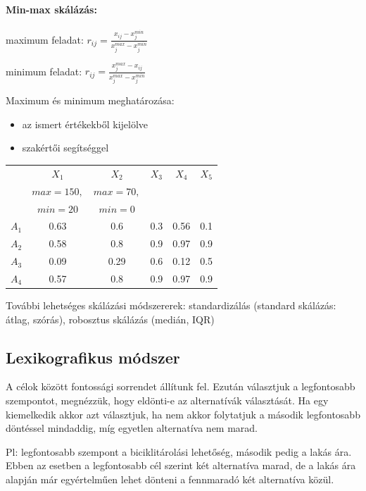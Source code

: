 \documentclass[a4paper,12pt]{article}
\begin{document}
\paragraph{Min-max skálázás:}
\begin{center}
maximum feladat: $r_{ij} = \frac{x_{ij} - x^{min}_j}{x^{max}_j - x^{min}_j} $ 

minimum feladat: $r_{ij} = \frac{x^{max}_j - x_{ij}}{x^{max}_j - x^{min}_j} $
\end{center}
Maximum és minimum meghatározása:
\vspace{-0.2cm}
\begin{itemize}
\item az ismert értékekből kijelölve
\vspace{-0.3cm}
\item szakértői segítséggel
\end{itemize}

\begin{center}
\begin{tabular}{c||c|c|c|c|c}
 & $X_1$& $X_2$& $X_3$& $X_4$& $X_5$ \\
  &\small{$max=150,$}&\small{$max=70,$}	&		&		&	\\
 &\small{$min=20$}&\small{$min=0$}	&		&		& \\
 \hline
 $A_1$&0.63  &0.6 &  0.3 & 0.56 & 0.1 \\
 $A_2$&0.58  &0.8 & 0.9 & 0.97 & 0.9 \\
 $A_3$&0.09  &0.29 & 0.6 & 0.12 & 0.5 \\
 $A_4$&0.57  &0.8 & 0.9 & 0.97 & 0.9 \\
\end{tabular}
\end{center}

További lehetséges skálázási módszererek: standardizálás (standard skálázás: átlag, szórás), robosztus skálázás (medián, IQR)

\subsection{Lexikografikus módszer}

A célok között fontossági sorrendet állítunk fel. Ezután választjuk a legfontosabb szempontot, megnézzük, hogy eldönti-e az alternatívák választását. Ha egy kiemelkedik akkor azt választjuk, ha nem akkor folytatjuk a második legfontosabb döntéssel mindaddig, míg egyetlen alternatíva nem marad.

Pl: legfontosabb szempont a biciklitárolási lehetőség, második pedig a lakás ára. Ebben az esetben a legfontosabb cél szerint két alternatíva marad, de a lakás ára alapján már egyértelműen lehet dönteni a fennmaradó két alternatíva közül.
\end{document}
